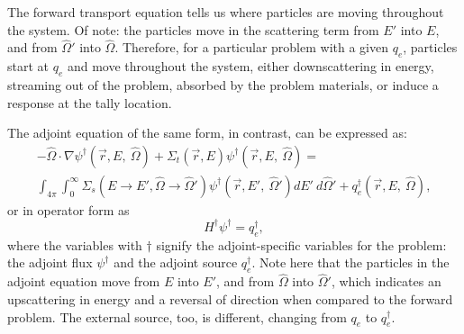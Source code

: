 The forward transport equation tells us where particles are moving
throughout the system. Of note: the
particles move in the scattering term from $E'$ into $E$, and from $\hat\Omega'$
into $\hat\Omega$. Therefore, for a particular problem with a given $q_{e}$,
particles start at $q_e$ and move throughout the system,
either downscattering in energy, streaming out of the problem,
absorbed by the problem materials, or
induce a response at the tally location.

The adjoint equation of the same form, in contrast, can be expressed as:
\begin{multline}
-\hat\Omega \cdot \nabla \psi^{\dagger}
        (\vec {r} ,E,\:\hat\Omega)+\Sigma _{ t }
        (\vec{r},E)\psi^{\dagger}  (\vec { r } ,E,\:\hat\Omega)
       = \\
        \int _{ 4\pi  } \int _{ 0 }^{ \infty  } \Sigma _{ s }(E\rightarrow E',
        \hat\Omega\rightarrow\hat\Omega')\psi^{\dagger}  (\vec { r } ,E',\:
        \hat\Omega')dE' \:d\hat\Omega' + q_{e}^\dagger(\vec { r } ,E,
        \:\hat\Omega),
\label{eq:A-NTE}
\end{multline}
or in operator form as
\begin{equation}
  H^{\dagger} \psi^{\dagger} = q_{e}^{\dagger},
\label{eq:A-NTE2}
\end{equation}
where the variables with $\dagger$ signify the adjoint-specific variables for
the problem: the adjoint flux $\psi^{\dagger}$ and the adjoint source
$q_{e}^{\dagger}$.
Note here that the particles in the adjoint equation move from $E$ into $E'$, and
from $\hat\Omega$ into $\hat\Omega'$, which indicates an upscattering in energy
and a reversal of direction when compared to the forward problem.
The external source, too, is different, changing
from $q_{e}$ to $q_{e}^\dagger$.

